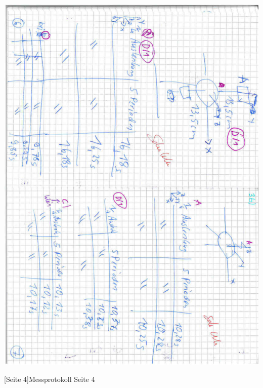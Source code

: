\documentclass[12pt,a4paper,]{scrreprt}
\begin{document}
        \begin{center}
    		\includegraphics[scale=0.7]{4.pdf}
    	\end{center}
    	[Seite 4]{Messprotokoll Seite 4}
    	\pagebreak
    	
\end{document}
